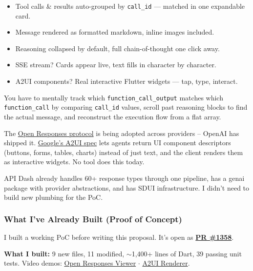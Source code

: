 \documentclass[11pt,a4paper]{article}
\begin{document}
{\begin{minipage}[t]{0.475\textwidth}
{{      {\small
      \begin{itemize}[leftmargin=1.2em, itemsep=5pt, topsep=0pt, parsep=0pt]
        \item Tool calls \& results auto-grouped by \texttt{call\_id} --- matched in one expandable card.
        \item Message rendered as formatted markdown, inline images included.
        \item Reasoning collapsed by default, full chain-of-thought one click away.
        \item SSE stream? Cards appear live, text fills in character by character.
        \item A2UI components? Real interactive Flutter widgets --- tap, type, interact.
      \end{itemize}
      }
      \vspace{4pt}
    }%
  }
\end{minipage}%
}%
\vspace{10pt}

You have to mentally track which \texttt{function\_call\_output} matches which \texttt{function\_call} by comparing \texttt{call\_id} values, scroll past reasoning blocks to find the actual message, and reconstruct the execution flow from a flat array.

The \href{https://www.openresponses.org/}{Open Responses protocol} is being adopted across providers -- OpenAI has shipped it. \href{https://github.com/google/A2UI}{Google's A2UI spec} lets agents return UI component descriptors (buttons, forms, tables, charts) instead of just text, and the client renders them as interactive widgets. No tool does this today.

API Dash already handles 60+ response types through one pipeline, has a genai package with provider abstractions, and has SDUI infrastructure. I didn't need to build new plumbing for the PoC.

\subsubsection{What I've Already Built (Proof of Concept)}

I built a working PoC before writing this proposal. It's open as \href{https://github.com/foss42/apidash/pull/1358}{\textbf{PR \#1358}}.

\textbf{What I built:} 9 new files, 11 modified, $\sim$1,400+ lines of Dart, 39 passing unit tests. Video demos: \href{https://youtu.be/paN-KGIhNms}{Open Responses Viewer} $\cdot$ \href{https://youtu.be/T2KbHth736U}{A2UI Renderer}.
\end{document}
